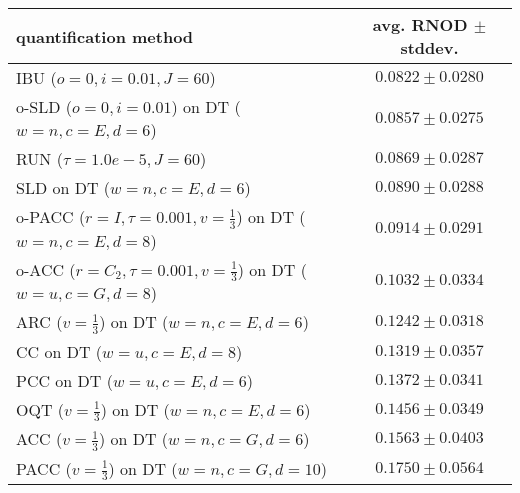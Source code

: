 \begin{tabular}{lc}
  \toprule
  quantification method & avg. RNOD $\pm$ stddev. \\
  \midrule
  IBU ($o=0, i=0.01, J=60$) & $\mathbf{0.0822 \pm 0.0280}$ \\
  o-SLD ($o=0, i=0.01$) on DT ($w=n, c=E, d=6$) & $0.0857 \pm 0.0275$ \\
  RUN ($\tau=1.0e-5, J=60$) & $0.0869 \pm 0.0287$ \\
  SLD on DT ($w=n, c=E, d=6$) & $0.0890 \pm 0.0288$ \\
  o-PACC ($r=I, \tau=0.001, v=\frac{1}{3}$) on DT ($w=n, c=E, d=8$) & $0.0914 \pm 0.0291$ \\
  o-ACC ($r=C_2, \tau=0.001, v=\frac{1}{3}$) on DT ($w=u, c=G, d=8$) & $0.1032 \pm 0.0334$ \\
  ARC ($v=\frac{1}{3}$) on DT ($w=n, c=E, d=6$) & $0.1242 \pm 0.0318$ \\
  CC on DT ($w=u, c=E, d=8$) & $0.1319 \pm 0.0357$ \\
  PCC on DT ($w=u, c=E, d=6$) & $0.1372 \pm 0.0341$ \\
  OQT ($v=\frac{1}{3}$) on DT ($w=n, c=E, d=6$) & $0.1456 \pm 0.0349$ \\
  ACC ($v=\frac{1}{3}$) on DT ($w=n, c=G, d=6$) & $0.1563 \pm 0.0403$ \\
  PACC ($v=\frac{1}{3}$) on DT ($w=n, c=G, d=10$) & $0.1750 \pm 0.0564$ \\
  \bottomrule
\end{tabular}
